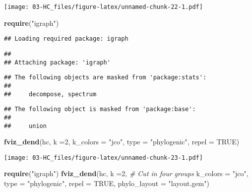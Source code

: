 \documentclass[
]{elegantbook}
\newenvironment{Shaded}{\begin{snugshade}}{\end{snugshade}}
\newcommand{\AttributeTok}[1]{\textcolor[rgb]{0.13,0.29,0.53}{#1}}
\newcommand{\CommentTok}[1]{\textcolor[rgb]{0.56,0.35,0.01}{\textit{#1}}}
\newcommand{\ConstantTok}[1]{\textcolor[rgb]{0.56,0.35,0.01}{#1}}
\newcommand{\DecValTok}[1]{\textcolor[rgb]{0.00,0.00,0.81}{#1}}
\newcommand{\FunctionTok}[1]{\textcolor[rgb]{0.13,0.29,0.53}{\textbf{#1}}}
\newcommand{\NormalTok}[1]{#1}
\newcommand{\StringTok}[1]{\textcolor[rgb]{0.31,0.60,0.02}{#1}}
\begin{document}
\texttt{[image: 03-HC\_files/figure-latex/unnamed-chunk-22-1.pdf]}

\begin{Shaded}
\begin{Highlighting}[]
\FunctionTok{require}\NormalTok{(}\StringTok{"igraph"}\NormalTok{)}
\end{Highlighting}
\end{Shaded}

\begin{verbatim}
## Loading required package: igraph
\end{verbatim}

\begin{verbatim}
## 
## Attaching package: 'igraph'
\end{verbatim}

\begin{verbatim}
## The following objects are masked from 'package:stats':
## 
##     decompose, spectrum
\end{verbatim}

\begin{verbatim}
## The following object is masked from 'package:base':
## 
##     union
\end{verbatim}

\begin{Shaded}
\begin{Highlighting}[]
\FunctionTok{fviz\_dend}\NormalTok{(hc, }\AttributeTok{k =}\DecValTok{2}\NormalTok{, }\AttributeTok{k\_colors =} \StringTok{"jco"}\NormalTok{,}
\AttributeTok{type =} \StringTok{"phylogenic"}\NormalTok{, }\AttributeTok{repel =} \ConstantTok{TRUE}\NormalTok{)}
\end{Highlighting}
\end{Shaded}

\texttt{[image: 03-HC\_files/figure-latex/unnamed-chunk-23-1.pdf]}

\begin{Shaded}
\begin{Highlighting}[]
\FunctionTok{require}\NormalTok{(}\StringTok{"igraph"}\NormalTok{)}
\FunctionTok{fviz\_dend}\NormalTok{(hc, }\AttributeTok{k =}\DecValTok{2}\NormalTok{, }\CommentTok{\# Cut in four groups}
\AttributeTok{k\_colors =} \StringTok{"jco"}\NormalTok{,}
\AttributeTok{type =} \StringTok{"phylogenic"}\NormalTok{, }\AttributeTok{repel =} \ConstantTok{TRUE}\NormalTok{,}
\AttributeTok{phylo\_layout =} \StringTok{"layout.gem"}\NormalTok{)}
\end{Highlighting}
\end{Shaded}
\end{document}
